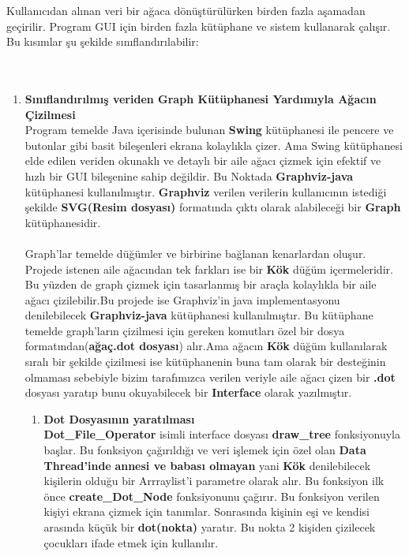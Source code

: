 \documentclass[conference]{IEEEtran}
\begin{document}
Kullanıcıdan alınan veri bir ağaca dönüştürülürken birden fazla aşamadan geçirilir.  Program GUI için birden fazla kütüphane ve sistem kullanarak çalışır. Bu kısımlar şu şekilde sınıflandırılabilir:\\\\\\
\begin{enumerate}
    \item \textbf{Sınıflandırılmış veriden Graph Kütüphanesi Yardımıyla Ağacın Çizilmesi}\\
    Program temelde Java içerisinde bulunan  \textbf{Swing} kütüphanesi ile pencere ve butonlar gibi basit bileşenleri ekrana kolaylıkla çizer. Ama Swing kütüphanesi elde edilen veriden okunaklı ve detaylı bir aile ağacı çizmek için efektif ve hızlı bir GUI bileşenine sahip değildir. Bu Noktada \textbf{Graphviz-java} kütüphanesi kullanılmıştır. \textbf{Graphviz} verilen verilerin kullanıcının istediği şekilde \textbf{SVG(Resim dosyası)} formatında çıktı olarak alabileceği bir \textbf{Graph} kütüphanesidir.\\\\ Graph'lar temelde düğümler ve birbirine bağlanan kenarlardan oluşur. Projede istenen aile ağacından tek farkları ise bir \textbf{Kök} düğüm içermeleridir. Bu yüzden de graph çizmek için tasarlanmış bir araçla kolaylıkla bir aile ağacı çizilebilir.Bu projede ise Graphviz'in java implementasyonu denilebilecek \textbf{Graphviz-java} kütüphanesi kullanılmıştır. Bu kütüphane temelde graph'ların çizilmesi için gereken komutları özel bir dosya formatından(\textbf{ağaç.dot dosyası}) alır.Ama ağacın \textbf{Kök} düğüm kullanılarak sıralı bir şekilde çizilmesi ise kütüphanenin buna tam olarak bir desteğinin olmaması sebebiyle bizim tarafımızca verilen veriyle aile ağacı çizen bir \textbf{.dot } dosyası yaratıp bunu okuyabilecek bir \textbf{Interface} olarak  yazılmıştır.\\
    \begin{enumerate}
        \item \textbf{Dot Dosyasının yaratılması}\\
        \textbf{Dot\_File\_Operator} isimli interface dosyası \textbf{draw\_tree} fonksiyonuyla başlar. Bu fonksiyon çağırıldığı ve veri işlemek için özel olan \textbf{Data Thread'inde} \textbf{annesi ve babası olmayan} yani \textbf{Kök} denilebilecek kişilerin olduğu bir Arrraylist'i parametre olarak alır. Bu fonksiyon ilk önce \textbf{create\_Dot\_Node} fonksiyonunu çağırır. Bu fonksiyon verilen kişiyi ekrana çizmek için tanımlar. Sonrasında kişinin eşi ve kendisi arasında küçük bir \textbf{dot(nokta)} yaratır. Bu nokta 2 kişiden çizilecek çocukları ifade etmek için kullanılır.

\end{enumerate}
\end{enumerate}
\end{document}
